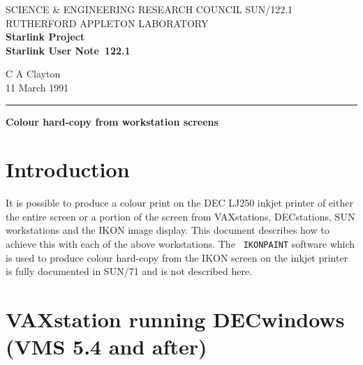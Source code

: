 \pagestyle{myheadings}

\newcommand{\stardoccategory}  {Starlink User Note}
\newcommand{\stardocinitials}  {SUN}
\newcommand{\stardocnumber}    {122.1}
\newcommand{\stardocauthors}   {C A Clayton}
\newcommand{\stardocdate}      {11 March 1991}
\newcommand{\stardoctitle}     {Colour hard-copy from workstation screens}

\newcommand{\stardocname}{\stardocinitials /\stardocnumber}
\markright{\stardocname}
\setlength{\textwidth}{160mm}
\setlength{\textheight}{240mm}
\setlength{\topmargin}{-5mm}
\setlength{\oddsidemargin}{0mm}
\setlength{\evensidemargin}{0mm}
\setlength{\parindent}{0mm}
\setlength{\parskip}{\medskipamount}
\setlength{\unitlength}{1mm}


\thispagestyle{empty}
SCIENCE \& ENGINEERING RESEARCH COUNCIL \hfill \stardocname\\
RUTHERFORD APPLETON LABORATORY\\
{\large\bf Starlink Project\\}
{\large\bf \stardoccategory\ \stardocnumber}
\begin{flushright}
\stardocauthors\\
\stardocdate
\end{flushright}
\vspace{-4mm}
\rule{\textwidth}{0.5mm}
\vspace{5mm}
\begin{center}
{\Large\bf \stardoctitle}
\end{center}
\vspace{5mm}

\section{Introduction}

It is possible to produce a colour print on the DEC LJ250 inkjet printer of
either the entire screen or a portion of the screen from VAXstations,
DECstations, SUN workstations and the IKON image display.  This document
describes how to achieve this with each of the above workstations. The {\tt
IKONPAINT} software which is used to produce colour hard-copy from the IKON
screen on the inkjet printer is fully documented in SUN/71 and is not described
here.


\section{VAXstation running DECwindows (VMS 5.4 and after)}


